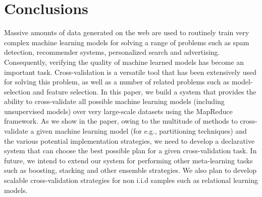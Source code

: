 \documentclass{vldb}
\begin{document}
\section{Conclusions}
\label{sec:conclusions}
Massive amounts of data generated on the web are used to routinely train very
complex machine learning models for solving a range of problems such as spam
detection, recommender systems, personalized search and advertising.
Consequently, verifying the quality of machine learned models has become an
important task. Cross-validation is a versatile tool that has been extensively
used for solving this problem, as well as a number of related problems such as
model-selection and feature selection.
In this paper, we build a system that provides the ability to cross-validate
all possible machine learning models
(including unsupervised models) over very large-scale datasets using the
MapReduce framework. As we show in the paper, owing to the multitude of methods
to cross-validate a given machine learning model (for e.g., partitioning
techniques) and the various potential implementation strategies, we need to
develop a declarative system that can choose the best possible plan for a given
cross-validation task. In future, we intend to extend our system for performing
other meta-learning tasks such as boosting, stacking and other ensemble
strategies. We also plan to develop scalable cross-validation strategies for non
i.i.d samples such as relational learning models.


{
\small
}
\end{document}
